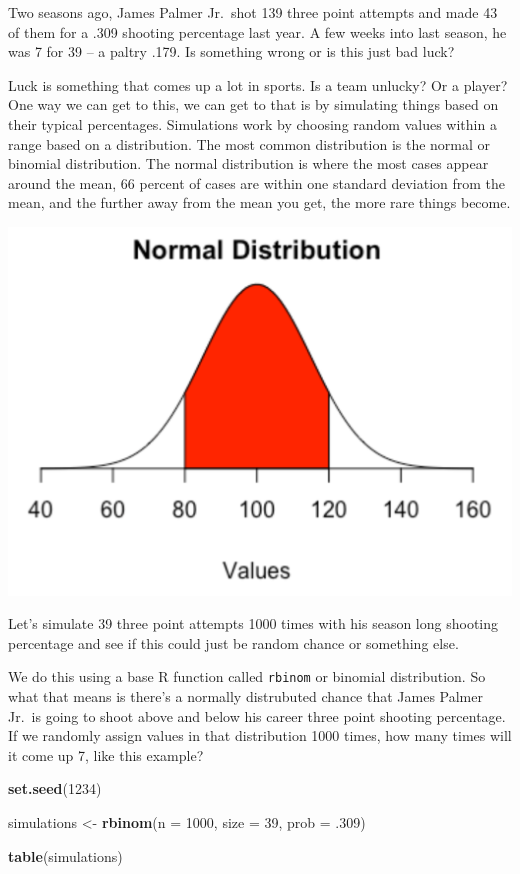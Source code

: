 \documentclass[
]{book}
\newenvironment{Shaded}{\begin{snugshade}}{\end{snugshade}}
\newcommand{\DataTypeTok}[1]{\textcolor[rgb]{0.13,0.29,0.53}{#1}}
\newcommand{\DecValTok}[1]{\textcolor[rgb]{0.00,0.00,0.81}{#1}}
\newcommand{\FloatTok}[1]{\textcolor[rgb]{0.00,0.00,0.81}{#1}}
\newcommand{\KeywordTok}[1]{\textcolor[rgb]{0.13,0.29,0.53}{\textbf{#1}}}
\newcommand{\NormalTok}[1]{#1}
\newcommand{\StringTok}[1]{\textcolor[rgb]{0.31,0.60,0.02}{#1}}
\begin{document}
Two seasons ago, James Palmer Jr.~shot 139 three point attempts and made 43 of them for a .309 shooting percentage last year. A few weeks into last season, he was 7 for 39 -- a paltry .179. Is something wrong or is this just bad luck?

Luck is something that comes up a lot in sports. Is a team unlucky? Or a player? One way we can get to this, we can get to that is by simulating things based on their typical percentages. Simulations work by choosing random values within a range based on a distribution. The most common distribution is the normal or binomial distribution. The normal distribution is where the most cases appear around the mean, 66 percent of cases are within one standard deviation from the mean, and the further away from the mean you get, the more rare things become.

\includegraphics[width=17.64in]{images/simulations2}

Let's simulate 39 three point attempts 1000 times with his season long shooting percentage and see if this could just be random chance or something else.

We do this using a base R function called \texttt{rbinom} or binomial distribution. So what that means is there's a normally distrubuted chance that James Palmer Jr.~is going to shoot above and below his career three point shooting percentage. If we randomly assign values in that distribution 1000 times, how many times will it come up 7, like this example?

\begin{Shaded}
\begin{Highlighting}[]
\KeywordTok{set.seed}\NormalTok{(}\DecValTok{1234}\NormalTok{)}

\NormalTok{simulations <-}\StringTok{ }\KeywordTok{rbinom}\NormalTok{(}\DataTypeTok{n =} \DecValTok{1000}\NormalTok{, }\DataTypeTok{size =} \DecValTok{39}\NormalTok{, }\DataTypeTok{prob =} \FloatTok{.309}\NormalTok{)}

\KeywordTok{table}\NormalTok{(simulations)}
\end{Highlighting}
\end{Shaded}
\end{document}
